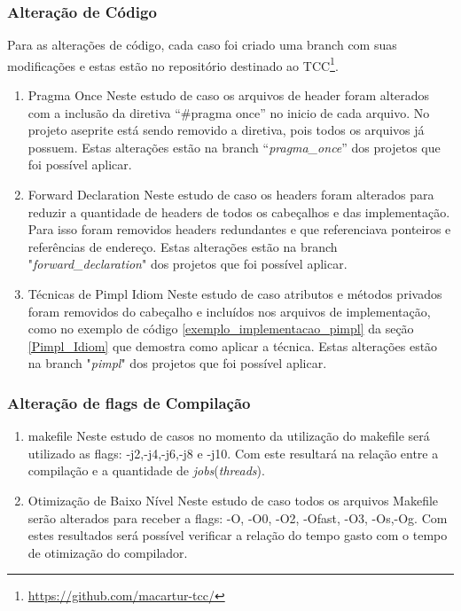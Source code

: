 \subsubsection{Alteração de Código}

 Para as alterações de código, cada caso foi criado
 uma branch com suas modificações e estas estão no repositório
 destinado ao TCC\footnote{\url{https://github.com/macartur-tcc/}}.

    \begin{enumerate}
        \item Pragma Once
        \subitem Neste estudo de caso os arquivos de header foram alterados
 com a inclusão da diretiva “\#pragma once” no inicio de cada arquivo.
 No projeto aseprite está sendo removido a diretiva, pois todos os arquivos já possuem.
Estas alterações estão na branch “\textit{pragma\_once}” dos projetos que foi possível aplicar.
        \item Forward Declaration
        \subitem Neste estudo de caso os headers foram alterados para reduzir
 a quantidade de headers de todos os cabeçalhos e das implementação.
 Para isso foram removidos headers redundantes e que referenciava
 ponteiros e referências de endereço.
Estas alterações estão na branch "\textit{forward\_declaration}" dos projetos que foi possível aplicar.
        \item Técnicas de Pimpl Idiom
        \subitem Neste estudo de caso atributos e métodos privados foram removidos do cabeçalho
 e incluídos nos arquivos de implementação, como no exemplo de código \ref{exemplo_implementacao_pimpl}
 da seção \ref{Pimpl_Idiom}
 que demostra como aplicar a técnica.
Estas alterações estão na branch "\textit{pimpl}" dos projetos que foi possível aplicar.
    \end{enumerate}

\subsubsection{Alteração de flags de Compilação}

        \begin{enumerate}
            \item makefile
                \subitem Neste estudo de casos no momento da utilização do makefile
 será utilizado as flags: -j2,-j4,-j6,-j8 e -j10. Com este resultará na relação entre
a compilação e a quantidade de \textit{jobs}(\textit{threads}).
            \item Otimização de Baixo Nível
                \subitem Neste estudo de caso todos os arquivos Makefile serão
 alterados para receber a flags: -O, -O0, -O2, -Ofast, -O3, -Os,-Og.
 Com estes resultados será possível verificar a relação do tempo gasto com
 o tempo de otimização do compilador.
        \end{enumerate}

